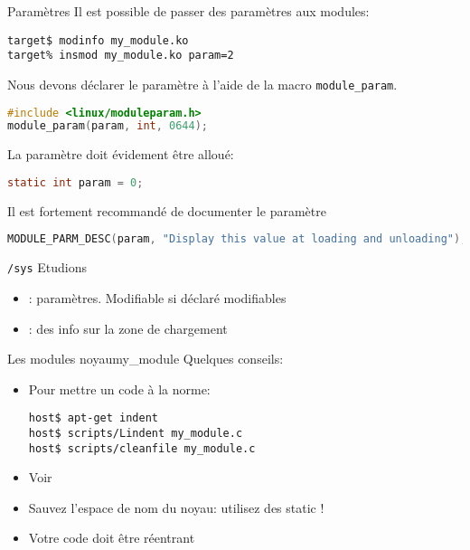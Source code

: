 \begin{frame}[fragile=singleslide]{Paramètres}
  Il est possible de passer des paramètres aux modules:
  \begin{lstlisting}
target$ modinfo my_module.ko
target% insmod my_module.ko param=2
  \end{lstlisting} %
  Nous devons déclarer le paramètre à l'aide de la macro \texttt{module\_param}.
  \begin{lstlisting}[language=c]
#include <linux/moduleparam.h>
module_param(param, int, 0644);
  \end{lstlisting}
  La paramètre doit évidement être alloué:
  \begin{lstlisting}[language=c]
static int param = 0;
  \end{lstlisting}
  Il est fortement recommandé de documenter le paramètre
  \begin{lstlisting}[language=c]
MODULE_PARM_DESC(param, "Display this value at loading and unloading");
  \end{lstlisting}
\end{frame}

\begin{frame}[fragile=singleslide]{\texttt{/sys}}
  Etudions 
  \begin{itemize}
  \item                       {}:
    paramètres. Modifiable si déclaré modifiables
  \item {}:  des info sur  la zone
    de chargement
  \end{itemize}
\end{frame}

\begin{frame}[fragile=singleslide]{Les modules noyau}{my\_module}
  Quelques conseils:
  \begin{itemize}
  \item  Pour mettre un code à la norme:
    \begin{lstlisting}
host$ apt-get indent
host$ scripts/Lindent my_module.c
host$ scripts/cleanfile my_module.c
    \end{lstlisting} %
  \item Voir 
  \item Sauvez l'espace de nom du noyau: utilisez des static !
  \item Votre code doit être réentrant
  \end{itemize}
\end{frame}


